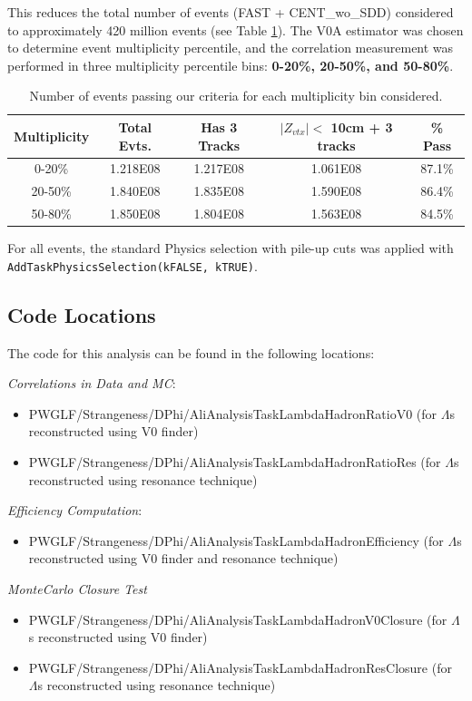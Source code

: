 \documentclass[ALICE,manyauthors]{ALICE_analysis_notes}
\begin{document}
This reduces the total number of events (FAST + CENT\_wo\_SDD) considered to approximately 420 million events (see Table \ref{event_table}). The V0A estimator was chosen to determine event multiplicity percentile, and the correlation measurement was performed in three multiplicity percentile bins: \textbf{0-20\%, 20-50\%, and 50-80\%}.

\begin{table}[h!]
    \centering
\begin{tabular}{| c | c | c | c || c | }
\hline
Multiplicity & Total Evts. & Has 3 Tracks & $|Z_{vtx}| <$  10cm + 3 tracks & \% Pass \\
\hline
0-20\% & 1.218E08 & 1.217E08 & 1.061E08 & 87.1\%\\
20-50\% & 1.840E08 & 1.835E08 & 1.590E08 & 86.4\%\\
50-80\% & 1.850E08 & 1.804E08 & 1.563E08 & 84.5\%\\
\hline
\end{tabular}
\caption{Number of events passing our criteria for each multiplicity bin considered.}
\label{event_table}
\end{table}

For all events, the standard Physics selection with pile-up cuts was applied with \texttt{AddTaskPhysicsSelection(kFALSE, kTRUE)}.

\subsection{Code Locations}
The code for this analysis can be found in the following locations:

\textit{Correlations in Data and MC}:
\begin{itemize}
\item  PWGLF/Strangeness/DPhi/AliAnalysisTaskLambdaHadronRatioV0 (for $\Lambda$s reconstructed using V0 finder)
\item  PWGLF/Strangeness/DPhi/AliAnalysisTaskLambdaHadronRatioRes (for $\Lambda$s reconstructed using resonance technique)
\end{itemize}

\textit{Efficiency Computation}:
\begin{itemize}
\item  PWGLF/Strangeness/DPhi/AliAnalysisTaskLambdaHadronEfficiency (for $\Lambda$s reconstructed using V0 finder and resonance technique)
\end{itemize}

\textit{MonteCarlo Closure Test}
\begin{itemize}
\item  PWGLF/Strangeness/DPhi/AliAnalysisTaskLambdaHadronV0Closure (for $\Lambda$s reconstructed using V0 finder)
\item  PWGLF/Strangeness/DPhi/AliAnalysisTaskLambdaHadronResClosure (for $\Lambda$s reconstructed using resonance technique)
\end{itemize}
\end{document}
